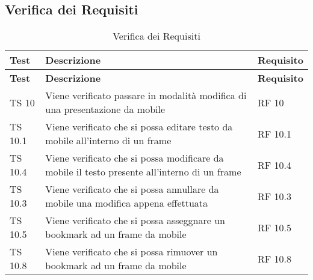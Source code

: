 \subsection{Verifica dei Requisiti}{
		\renewcommand*{\arraystretch}{1.4}
		\begin{longtable} [c]{| p{3cm} | p{6cm} |p{3cm}|}
			\caption{Verifica dei Requisiti \label{tab:verReq}}\\
			 \hline
			 \textbf{Test} & \textbf{Descrizione} & \textbf{Requisito} \\
			 \hline
			 \endfirsthead
			 \hline
			 \textbf{Test} & \textbf{Descrizione} & \textbf{Requisito} \\
			 \hline
			\endhead
			 \hline
			 \endfoot
			 \hline
			 \endlastfoot
			TS 10 & Viene verificato passare in modalità modifica di una presentazione da mobile & RF 10\\
			\hline
			TS 10.1 & Viene verificato che si possa editare testo da mobile all'interno di un frame & RF 10.1\\
			\hline
			TS 10.4 & Viene verificato che si possa modificare da mobile il testo presente all'interno di un frame & RF 10.4\\
			\hline
			TS 10.3 & Viene verificato che si possa annullare da mobile una modifica appena effettuata & RF 10.3\\
			\hline
			TS 10.5 & Viene verificato che si possa asseggnare un bookmark ad un frame da mobile & RF 10.5\\
			\hline
			TS 10.8 & Viene verificato che si possa rimuover un bookmark ad un frame da mobile & RF 10.8\\
		\end{longtable}
	}
